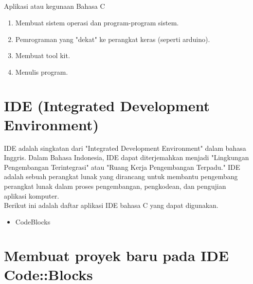 \subsection*{}Aplikasi atau kegunaan Bahasa C
\begin{enumerate}
	\item     Membuat sistem operasi dan program-program sistem.
	\item Pemrograman yang "dekat" ke perangkat keras (seperti arduino).
	\item Membuat tool kit.
	\item Menulis program.
\end{enumerate}
\section{IDE (Integrated Development Environment)}
IDE adalah singkatan dari "Integrated Development Environment" dalam bahasa Inggris.
Dalam Bahasa Indonesia, IDE dapat diterjemahkan menjadi "Lingkungan Pengembangan Terintegrasi" atau "Ruang Kerja Pengembangan Terpadu."
IDE adalah sebuah perangkat lunak yang dirancang untuk membantu pengembang perangkat lunak dalam proses pengembangan, pengkodean, dan pengujian aplikasi komputer.
\\
Berikut ini adalah daftar aplikasi IDE bahasa C yang dapat digunakan.
\begin{itemize}
	\item CodeBlocks
\end{itemize}
\section{Membuat proyek baru pada IDE Code::Blocks}
